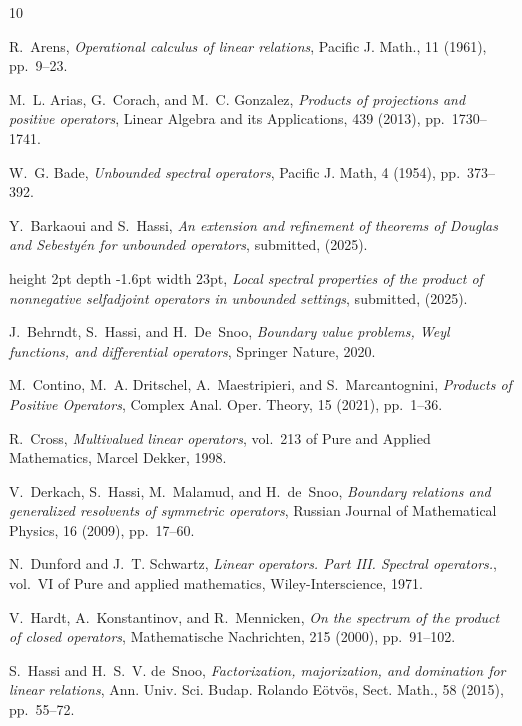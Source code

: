 \documentclass{amsart}
\numberwithin{equation}{section}
\begin{document}
\begin{thebibliography}{10}

{\sc R.~Arens}, {\em {Operational calculus of linear relations}}, Pacific J.
  Math., 11 (1961), pp.~9--23.

{\sc M.~L. Arias, G.~Corach, and M.~C. Gonzalez}, {\em Products of projections
  and positive operators}, Linear Algebra and its Applications, 439 (2013),
  pp.~1730--1741.

{\sc W.~G. Bade}, {\em Unbounded spectral operators}, Pacific J. Math, 4
  (1954), pp.~373--392.

{\sc Y.~Barkaoui and S.~Hassi}, {\em An extension and refinement of theorems of
  {Douglas} and {Sebestyén} for unbounded operators}, submitted,  (2025).

\leavevmode\vrule height 2pt depth -1.6pt width 23pt, {\em Local spectral
  properties of the product of nonnegative selfadjoint operators in unbounded
  settings}, submitted,  (2025).

{\sc J.~Behrndt, S.~Hassi, and H.~De~Snoo}, {\em Boundary value problems, Weyl
  functions, and differential operators}, Springer Nature, 2020.

{\sc M.~Contino, M.~A. Dritschel, A.~Maestripieri, and S.~Marcantognini}, {\em
  {Products of Positive Operators}}, Complex Anal. Oper. Theory, 15 (2021),
  pp.~1--36.

{\sc R.~Cross}, {\em {Multivalued linear operators}}, vol.~213 of Pure and
  Applied Mathematics, Marcel Dekker, 1998.

{\sc V.~Derkach, S.~Hassi, M.~Malamud, and H.~de~Snoo}, {\em Boundary relations
  and generalized resolvents of symmetric operators}, Russian Journal of
  Mathematical Physics, 16 (2009), pp.~17--60.

{\sc N.~Dunford and J.~T. Schwartz}, {\em {Linear operators. Part III. Spectral
  operators.}}, vol.~VI of Pure and applied mathematics, Wiley-Interscience,
  1971.

{\sc V.~Hardt, A.~Konstantinov, and R.~Mennicken}, {\em On the spectrum of the
  product of closed operators}, Mathematische Nachrichten, 215 (2000),
  pp.~91--102.

{\sc S.~Hassi and H.~S.~V. de~Snoo}, {\em {Factorization, majorization, and
  domination for linear relations}}, Ann. Univ. Sci. Budap. Rolando
  E{\"{o}}tv{\"{o}}s, Sect. Math., 58 (2015), pp.~55--72.


\end{thebibliography}
\end{document}
